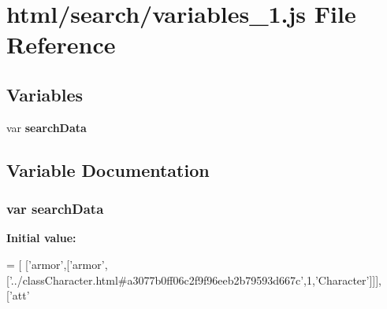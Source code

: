 \section{html/search/variables\-\_\-1.js File Reference}
\label{variables__1_8js}
\subsection*{Variables}
\begin{DoxyCompactItemize}
\item 
var {\bf search\-Data}
\end{DoxyCompactItemize}


\subsection{Variable Documentation}
\subsubsection[{search\-Data}]{\setlength{\rightskip}{0pt plus 5cm}var search\-Data}\label{variables__1_8js_ad01a7523f103d6242ef9b0451861231e}
{\bfseries Initial value\-:}
\begin{DoxyCode}
=
[
  [\textcolor{stringliteral}{'armor'},[\textcolor{stringliteral}{'armor'},[\textcolor{stringliteral}{'../classCharacter.html#a3077b0ff06c2f9f96eeb2b79593d667c'},1,\textcolor{stringliteral}{'Character'}]]],
  [\textcolor{stringliteral}{'att'}
\end{DoxyCode}
